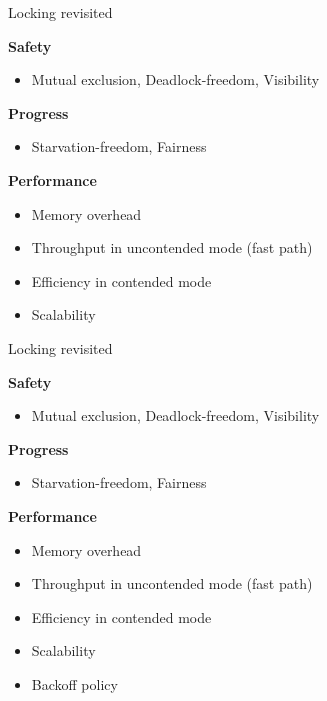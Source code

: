 

\begin{frame}[t,noframenumbering]{Locking revisited}

\textbf{Safety}
\begin{itemize}
  \item Mutual exclusion, Deadlock-freedom, Visibility
\end{itemize}

\textbf{Progress}
\begin{itemize}
  \item Starvation-freedom, Fairness  
\end{itemize}

\textbf{Performance}
\begin{itemize}
  \item Memory overhead   
  \item Throughput in uncontended mode (fast path)
  \item Efficiency in contended mode   
  \pause  
  \item Scalability
\end{itemize}
\end{frame}



\begin{frame}[t,noframenumbering]{Locking revisited}

\textbf{Safety}
\begin{itemize}
  \item Mutual exclusion, Deadlock-freedom, Visibility
\end{itemize}

\textbf{Progress}
\begin{itemize}
  \item Starvation-freedom, Fairness  
\end{itemize}

\textbf{Performance}
\begin{itemize}
  \item Memory overhead   
  \item Throughput in uncontended mode (fast path)
  \item Efficiency in contended mode     
  \item Scalability
  \pause
  \item Backoff policy  
\end{itemize}

\end{frame}

